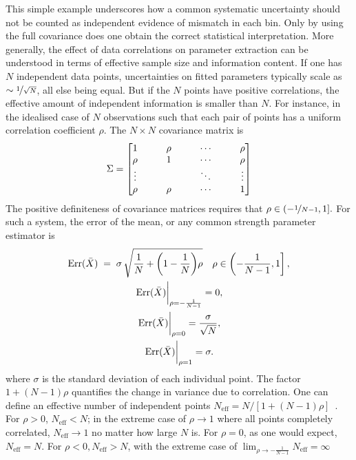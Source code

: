     This simple example underscores how a common systematic uncertainty should not be counted as independent evidence of mismatch in each bin.
    Only by using the full covariance does one obtain the correct statistical interpretation.
    More generally, the effect of data correlations on parameter extraction can be understood in terms of effective sample size and information content.
    If one has $N$ independent data points, uncertainties on fitted parameters typically scale as $\sim \nicefrac1{\sqrt{N}}$, all else being equal.
    But if the $N$ points have positive correlations, the effective amount of independent information is smaller than $N$.
    For instance, in the idealised case of \(N\) observations such that each pair of points has a uniform correlation coefficient \(\rho\).
    The \(N\times N\) covariance matrix is
    \[
        {
            \setlength{\arraycolsep}{1.5em}
            \Sigma =    \mqty[1      & \rho & \cdots & \rho \\
                                \rho   & 1    & \cdots & \rho \\
                                \vdots &      & \ddots & \vdots\\
                                \rho   & \rho & \cdots & 1
                                ]
        }
    \]
    The positive definiteness of covariance matrices requires that \(\rho\in(-\nicefrac{1}{N-1}, 1].\)
    For such a system, the error of the mean, or any common strength parameter estimator is
    \begin{gather}
        \label{eq:effective-N}
        \mathrm{Err}(\bar{X}) \;=\; \sigma\,\sqrt{\frac1N + \qty(1 - \frac1N)\rho}\quad\rho\in\left(-\frac1{N-1}, 1\right],\\
       \eval{\mathrm{Err}(\bar{X})}_{\rho=-\frac{1}{N-1}} = 0,\\
       \eval{\mathrm{Err}(\bar{X})}_{\rho=0} = \frac{\sigma}{\sqrt{N}}, \\ \eval{\mathrm{Err}(\bar{X})}_{\rho = 1} = \sigma.
    \end{gather}
    where $\sigma$ is the standard deviation of each individual point.
    The factor $1+(N-1)\rho$ quantifies the change in variance due to correlation.
    One can define an effective number of independent points $N_{\text{eff}} = N/[1+(N-1)\rho]$~\cite{thompson_power_2021, wang_power_2022, baumann_tutorial_2025, Yang2011EffectiveAnalyses}.
    For $\rho>0$, $N_{\text{eff}}<N$; in the extreme case of $\rho\to 1$ where all points completely correlated, $N_{\text{eff}}\to 1$ no matter how large $N$ is.
    For \(\rho = 0\), as one would expect, \(N_{\text{eff}} = N.\)
    For \(\rho < 0, N_{\text{eff}} > N\), with the extreme case of \(\lim_{\rho\to-\frac1{N-1}}N_{\text{eff}} = \infty\)
    
